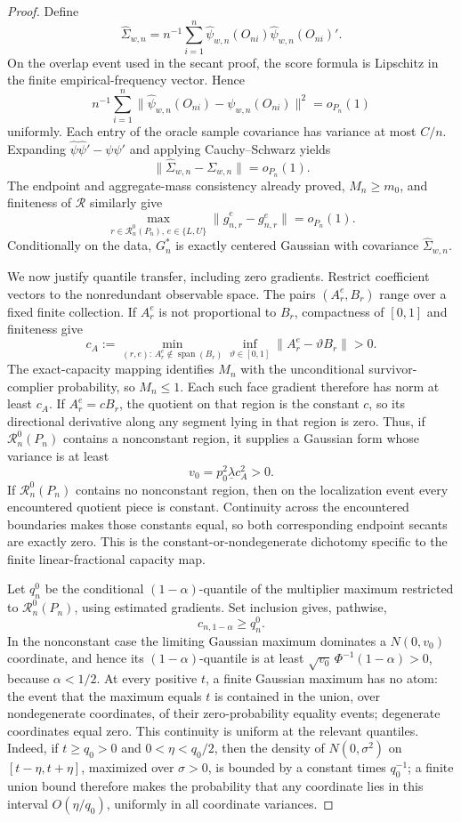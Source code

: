 \documentclass{article}
\begin{document}
\begin{proof}
Define
\[
 \widehat\Sigma_{w,n}=n^{-1}\sum_{i=1}^n
 \widehat\psi_{w,n}(O_{ni})\widehat\psi_{w,n}(O_{ni})'.
\]
On the overlap event used in the secant proof, the score formula is Lipschitz in the finite empirical-frequency vector. Hence
\[
 n^{-1}\sum_{i=1}^n
 \lVert\widehat\psi_{w,n}(O_{ni})-\psi_{w,n}(O_{ni})\rVert^2
 =o_{P_n}(1)
\]
uniformly. Each entry of the oracle sample covariance has variance at most \(C/n\). Expanding
\(\widehat\psi\widehat\psi'-\psi\psi'\) and applying Cauchy--Schwarz yields
\[
 \lVert\widehat\Sigma_{w,n}-\Sigma_{w,n}\rVert=o_{P_n}(1).
\]
The endpoint and aggregate-mass consistency already proved, \(M_n\ge m_0\), and finiteness of \(\mathcal R\) similarly give
\[
 \max_{r\in\mathcal R_n^0(P_n),\,e\in\{L,U\}}
 \lVert\widehat g^e_{n,r}-g^e_{n,r}\rVert=o_{P_n}(1).
\]
Conditionally on the data, \(G_n^*\) is exactly centered Gaussian with covariance \(\widehat\Sigma_{w,n}\).

We now justify quantile transfer, including zero gradients. Restrict coefficient vectors to the nonredundant observable space. The pairs \((A_r^e,B_r)\) range over a fixed finite collection. If \(A_r^e\) is not proportional to \(B_r\), compactness of \([0,1]\) and finiteness give
\[
 c_A:=\min_{(r,e):\,A_r^e\notin\operatorname{span}(B_r)}
       \inf_{\vartheta\in[0,1]}\lVert A_r^e-\vartheta B_r\rVert>0.
\]
The exact-capacity mapping identifies \(M_n\) with the unconditional survivor-complier probability, so \(M_n\le1\). Each such face gradient therefore has norm at least \(c_A\). If \(A_r^e=cB_r\), the quotient on that region is the constant \(c\), so its directional derivative along any segment lying in that region is zero. Thus, if \(\mathcal R_n^0(P_n)\) contains a nonconstant region, it supplies a Gaussian form whose variance is at least
\[
 v_0=p_0^2\underline\lambda c_A^2>0.
\]
If \(\mathcal R_n^0(P_n)\) contains no nonconstant region, then on the localization event every encountered quotient piece is constant. Continuity across the encountered boundaries makes those constants equal, so both corresponding endpoint secants are exactly zero. This is the constant-or-nondegenerate dichotomy specific to the finite linear-fractional capacity map.

Let \(q_n^0\) be the conditional \((1-\alpha)\)-quantile of the multiplier maximum restricted to \(\mathcal R_n^0(P_n)\), using estimated gradients. Set inclusion gives, pathwise,
\[
 c_{n,1-\alpha}\ge q_n^0.
\]
In the nonconstant case the limiting Gaussian maximum dominates a \(N(0,v_0)\) coordinate, and hence its \((1-\alpha)\)-quantile is at least
\(\sqrt{v_0}\,\Phi^{-1}(1-\alpha)>0\), because \(\alpha<1/2\). At every positive \(t\), a finite Gaussian maximum has no atom: the event that the maximum equals \(t\) is contained in the union, over nondegenerate coordinates, of their zero-probability equality events; degenerate coordinates equal zero. This continuity is uniform at the relevant quantiles. Indeed, if \(t\ge q_0>0\) and \(0<\eta<q_0/2\), then the density of \(N(0,\sigma^2)\) on \([t-\eta,t+\eta]\), maximized over \(\sigma>0\), is bounded by a constant times \(q_0^{-1}\); a finite union bound therefore makes the probability that any coordinate lies in this interval \(O(\eta/q_0)\), uniformly in all coordinate variances.


\end{proof}
\end{document}
